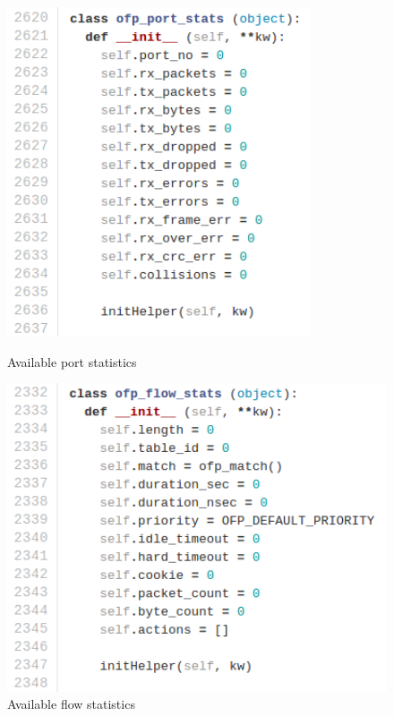 \documentclass[12pt,english,oneside]{book}
\begin{document}
\begin{figure}
\centering
\begin{minipage}{.5\textwidth}
  \centering
  \includegraphics[width=0.8\textwidth]{figures/stats_portstats.png}
  \caption{Available port statistics}
  \label{fig:stats_portstats}
\end{minipage}%
\begin{minipage}{.5\textwidth}
  \centering
  \includegraphics[width=1\textwidth]{figures/stats_flowstats.png}
  \caption{Available flow statistics}
  \label{fig:stats_flowstats}
\end{minipage}%
\end{figure}
\end{document}

